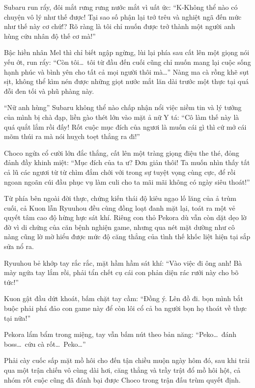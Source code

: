 \documentclass[../main.tex]{subfiles}
\begin{document}
Subaru run rẩy, đôi mắt rưng rưng nước mắt vì uất ức: ``K-Không thể nào có chuyện vô lý như thế được! Tại sao số phận lại trớ trêu và nghiệt ngã đến mức như thế này cơ chứ!? Rõ ràng là tôi chỉ muốn được trở thành một người anh hùng cứu nhân độ thế cơ mà!''

Bậc hiền nhân Mel thì chỉ biết ngập ngừng, lùi lại phía sau cất lên một giọng nói yếu ớt, run rẩy: ``Còn tôi\dots\ tôi từ đầu đến cuối cũng chỉ muốn mang lại cuộc sống hạnh phúc và bình yên cho tất cả mọi người thôi mà\dots'' Nàng ma cà rồng khẽ sụt sịt, không thể kìm nén được những giọt nước mắt lăn dài trước một thực tại quá đỗi đen tối và phũ phàng này.

``Nữ anh hùng'' Subaru không thể nào chấp nhận nổi việc niềm tin và lý tưởng của mình bị chà đạp, liền gào thét lớn vào mặt ả nữ Y tá: ``Cô làm thế này là quá quắt lắm rồi đấy! Rốt cuộc mục đích của ngươi là muốn cái gì thì cứ mở cái mõm thúi ra mà nói huỵch toẹt thẳng ra đi!''

Choco ngửa cổ cười lớn đắc thắng, cất lên một tràng giọng điệu the thé, đỏng đảnh đầy khinh miệt: ``Mục đích của ta ư? Đơn giản thôi! Ta muốn nhìn thấy tất cả lũ các ngươi từ từ chìm đắm chới với trong sự tuyệt vọng cùng cực, để rồi ngoan ngoãn cúi đầu phục vụ làm culi cho ta mãi mãi không có ngày siêu thoát!''

Từ phía bên ngoài đời thực, chứng kiến thái độ kiêu ngạo lố lăng của ả trùm cuối, cả Kuon lẫn Ryuuhou đều cùng đồng loạt đanh mặt lại, toát ra một vẻ quyết tâm cao độ hừng hực sát khí. Riêng con thỏ Pekora dù vẫn còn dặt dẹo lờ đờ vì di chứng của căn bệnh nghiện game, nhưng qua nét mặt dường như cô nàng cũng lờ mờ hiểu được mức độ căng thẳng của tình thế khốc liệt hiện tại sắp sửa nổ ra.

\il

Ryuuhou bẻ khớp tay rắc rắc, mặt hầm hầm sát khí: ``Vào việc đi ông anh! Bà mày ngứa tay lắm rồi, phải tẩn chết cụ cái con phản diện rác rưởi này cho bõ tức!''

Kuon gật đầu dứt khoát, bấm chặt tay cầm: ``Đồng ý. Lên đồ đi. bọn mình bắt buộc phải phá đảo con game này để còn lôi cổ cả ba người bọn họ thoát về thực tại nữa!''

Pekora lẩm bẩm trong miệng, tay vẫn bấm nút theo bản năng: ``Peko\dots\ đánh boss\dots\ cứu cà rốt\dots\ Peko\dots''

\il

\ct

Phải cày cuốc sấp mặt mồ hôi cho đến tận chiều muộn ngày hôm đó, sau khi trải qua một trận chiến vô cùng dài hơi, căng thẳng và trầy trật đổ mồ hôi hột, cả nhóm rốt cuộc cũng đã đánh bại được Choco trong trận đấu trùm quyết định.
\end{document}
